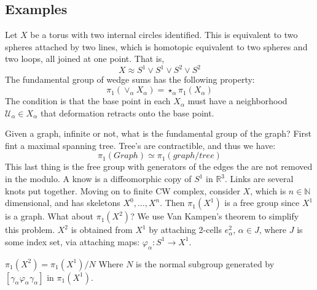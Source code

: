     \subsection{Examples}
        \begin{example}
            Let $X$ be a torus with two internal circles
            identified. This is equivalent to two spheres
            attached by two lines, which is homotopic equivalent
            to two spheres and two loops, all joined at one
            point. That is,
            \begin{equation}
                X\approx{S}^{1}\lor{S}^{1}\lor{S}^{2}\lor{S}^{2}
            \end{equation}
            The fundamental group of wedge sums has the
            following property:
            \begin{equation}
                \pi_{1}(\lor_{\alpha}X_{\alpha})=
                \star_{\alpha}\pi_{1}(X_{\alpha})
            \end{equation}
            The condition is that the base point in each
            $X_{\alpha}$ must have a neighborhood
            $\mathcal{U}_{\alpha}\in{X}_{\alpha}$ that
            deformation retracts onto the base point.
        \end{example}
        Given a graph, infinite or not, what is the fundamental
        group of the graph? First fint a maximal spanning
        tree. Tree's are contractible, and thus we have:
        \begin{equation}
            \pi_{1}(Graph)\simeq\pi_{1}(graph/tree)
        \end{equation}
        This last thing is the free group with generators of
        the edges the are not removed in the modulo.
        A know is a diffeomorphic copy of $S^{1}$ in
        $\mathbb{R}^{3}$. Links are several knots put together.
        Moving on to finite CW complex, consider $X$, which
        is $n\in\mathbb{N}$ dimensional, and has skeletons
        $X^{0},\dots,X^{n}$. Then $\pi_{1}(X^{1})$ is a
        free group since $X^{1}$ is a graph. What about
        $\pi_{1}(X^{2})$? We use Van Kampen's theorem to
        simplify this problem. $X^{2}$ is obtained from
        $X^{1}$ by attaching 2-cells $e_{\alpha}^{2}$,
        $\alpha\in{J}$, where $J$ is some index set, via
        attaching maps:
        $\varphi_{\alpha}:S^{1}\rightarrow{X}^{1}$.
        \begin{theorem}
            $\pi_{1}(X^{2})=\pi_{1}(X^{1})/N$
            Where $N$ is the normal subgroup generated by
            $[\gamma_{\alpha}\varphi_{\alpha}\gamma_{\alpha}]$
            in $\pi_{1}(X^{1})$.
        \end{theorem}

